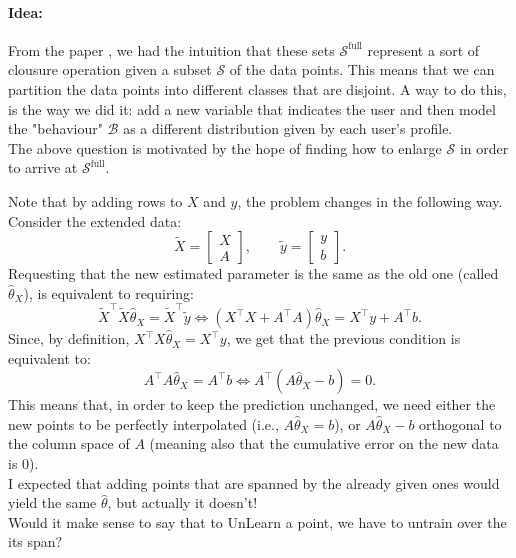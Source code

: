{\paragraph{Idea:} From the paper \cite{untraining_2026}, we had the intuition that these sets $\mathcal{S}^{\text{full}}$ represent a sort of clousure operation given a subset $\mathcal{S}$ of the data points.
This means that we can partition the data points into different classes that are disjoint. A way to do this, is the way we did it: add a new variable that indicates the user and then model the "behaviour" $\mathcal{B}$ as a different distribution given by each user's profile.\\
The above question is motivated by the hope of finding how to enlarge $\mathcal{S}$ in order to arrive at $\mathcal{S}^{\text{full}}$.

Note that by adding rows to $X$ and $y$, the problem changes in the following way.
Consider the extended data:
\begin{equation*}
  \tilde{X}=\begin{bmatrix}
    X\\
    A
  \end{bmatrix},\qquad \tilde{y}=\begin{bmatrix}
    y\\
    b
  \end{bmatrix}.
\end{equation*}
Requesting that the new estimated parameter is the same as the old one (called $\hat{\theta}_X$), is equivalent to requiring:
\begin{equation*}
  \tilde{X}^\top \tilde{X}\hat{\theta}_X=\tilde{X}^\top \tilde{y} \iff (X^\top X + A^\top A)\hat{\theta}_X = X^\top y + A^\top b.
\end{equation*}
Since, by definition, $X^\top X\hat{\theta}_X=X^\top y$, we get that the previous condition is equivalent to:
$$A^\top A\hat{\theta}_X=A^\top b \iff A^\top(A\hat{\theta}_X-b)=0.$$
This means that, in order to keep the prediction unchanged, we need either the new points to be perfectly interpolated (i.e., $A\hat{\theta}_X=b$), or $A\hat{\theta}_X-b$ orthogonal to the column space of $A$ (meaning also that the cumulative error on the new data is 0).\\
I expected that adding points that are spanned by the already given ones would yield the same $\hat{\theta}$, but actually it doesn't!
\\ \qst Would it make sense to say that to UnLearn a point, we have to untrain over the its span?

}
